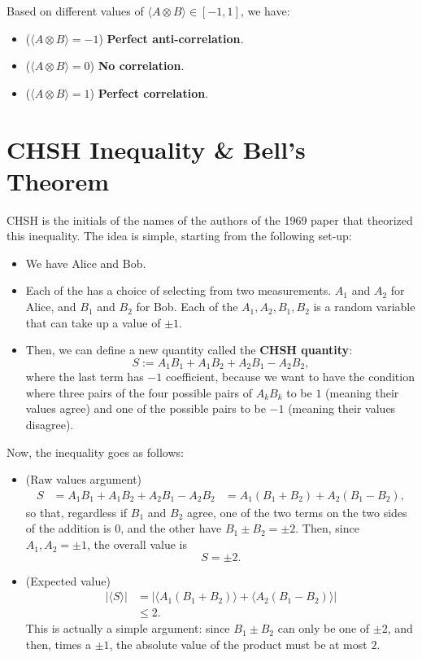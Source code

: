 \documentclass[12pt]{article}
\begin{document}
\begin{definition}
Based on different values of $\langle A\otimes B\rangle\in [-1, 1]$, we have:
\begin{itemize}
    \item ($\langle A\otimes B\rangle=-1$) \textbf{Perfect anti-correlation}.
    \item ($\langle A\otimes B\rangle=0$) \textbf{No correlation}.
    \item ($\langle A\otimes B\rangle=1$) \textbf{Perfect correlation}.
\end{itemize}
\end{definition}

\section{CHSH Inequality \& Bell's Theorem}
CHSH is the initials of the names of the authors of the 1969 paper that theorized this inequality. The idea is simple, starting from the following set-up:
\begin{itemize}
    \item We have Alice and Bob.
    \item Each of the has a choice of selecting from two measurements. $A_1$ and $A_2$ for Alice, and $B_1$ and $B_2$ for Bob. Each of the $A_1, A_2, B_1, B_2$ is a random variable that can take up a value of $\pm 1$.
    \item Then, we can define a new quantity called the \textbf{CHSH quantity}: $$
    S := A_1B_1 + A_1B_2 + A_2B_1 - A_2B_2,
    $$ where the last term has $-1$ coefficient, because we want to have the condition where three pairs of the four possible pairs of $A_kB_k$ to be $1$ (meaning their values agree) and one of the possible pairs to be $-1$ (meaning their values disagree).
\end{itemize}

\noindent Now, the inequality goes as follows:
\begin{itemize}
    \item (Raw values argument) $$
    \begin{aligned}
    S
        &= A_1B_1 + A_1B_2 + A_2B_1 - A_2B_2
        &= A_1(B_1 + B_2) + A_2(B_1 - B_2),
    \end{aligned}
    $$ so that, regardless if $B_1$ and $B_2$ agree, one of the two terms on the two sides of the addition is $0$, and the other have $B_1\pm B_2 = \pm 2$. Then, since $A_1, A_2 = \pm 1$, the overall value is $$
    \boxed{S = \pm 2}.
    $$
    \item (Expected value) $$
    \begin{aligned}
    |\langle S \rangle|
        &= |\langle A_1(B_1 + B_2)\rangle + \langle A_2(B_1 - B_2)\rangle| \\
        &\leq 2.
    \end{aligned}
    $$ This is actually a simple argument: since $B_1 \pm B_2$ can only be one of $\pm 2$, and then, times a $\pm 1$, the absolute value of the product must be at most $2$.
\end{itemize}
\end{document}
